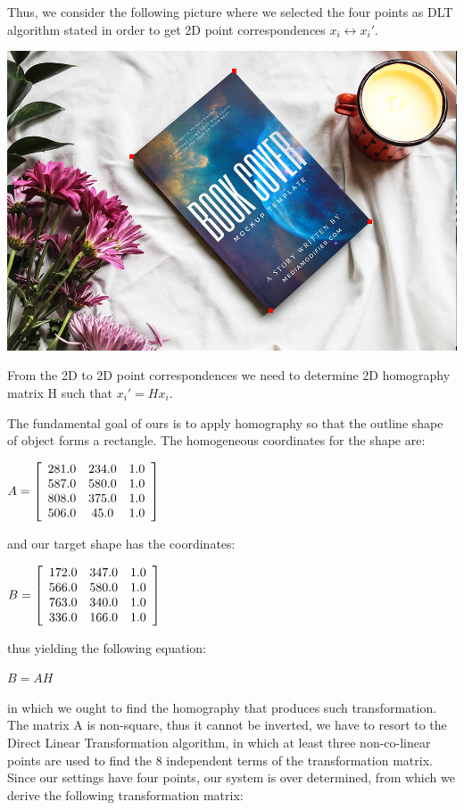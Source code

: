 \documentclass[]{article}
\begin{document}
Thus, we consider the following picture where we selected the four points as DLT algorithm stated in order to get 2D point correspondences {$x_i \leftrightarrow  x_i'$}.

\centerline {
	\includegraphics[scale=0.4]{src}
}

From the 2D to 2D point correspondences we need to determine 2D homography matrix H such that $x_i' = Hx_i$. 

The fundamental goal of ours is to apply homography so that the outline shape of object forms a rectangle. The homogeneous coordinates for the shape are:

\centerline {
	$A = \left[ {\begin{array}{*{20}c}
		281.0 & 234.0 & 1.0 \\
		587.0 & 580.0 & 1.0 \\
		808.0 & 375.0 & 1.0 \\
		506.0 & 45.0 & 1.0
		\end{array} } \right]$
}

and our target shape has the coordinates: 

\centerline {
	$B = \left[ {\begin{array}{*{20}c}
		172.0 & 347.0 & 1.0 \\
		566.0 & 580.0 & 1.0 \\
		763.0 & 340.0 & 1.0 \\
		336.0 & 166.0 & 1.0
		\end{array} } \right]$
}

thus yielding the following equation: 

\centerline {
	$B = AH$
}


in which we ought to find the homography that produces such transformation. The matrix A is non-square, thus it cannot be inverted, we have to resort to the Direct Linear Transformation algorithm, in which at least three non-co-linear points are used to find the 8 independent terms of the transformation matrix. Since our settings have four points, our system is over determined, from which we derive the following transformation matrix:
\end{document}
